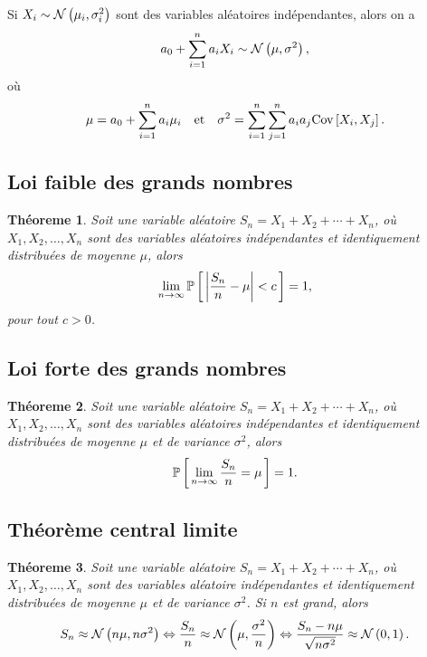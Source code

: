 \documentclass[11pt]{article}
\renewcommand\P[1]{%
	\ensuremath{%
		\mathbb{P}\left[\,#1\,\right]%
	}%
}%
\newcommand\Norm[2]{%
	\ensuremath{%
		\mathcal{N}\left(#1,#2\right)%
	}%
}%
\newcommand\Cov[2]{%
	\ensuremath{%
		\mathrm{Cov}\left[#1,#2\right]%
	}%
}%
\newtheorem{theoreme}{Théoreme}[section]
\theoremstyle{remark}
\theoremstyle{definition}
\begin{document}
\begin{exemple}
	Si $X_i\sim\Norm{\mu_i}{\sigma_i^2}$ sont des variables aléatoires
	indépendantes, alors on a
	\begin{equation*}
		a_0+\sum_{i=1}^na_iX_i\sim\Norm{\mu}{\sigma^2},
	\end{equation*}
	où
	\begin{equation*}
		\mu=a_0+\sum_{i=1}^na_i\mu_i
		\quad\text{et}\quad
		\sigma^2=\sum_{i=1}^n\sum_{j=1}^na_ia_j\Cov{X_i}{X_j}.
	\end{equation*}
\end{exemple}

\subsection{Loi faible des grands nombres}
\begin{theoreme}
	Soit une variable aléatoire $S_n=X_1+X_2+\cdots+X_n$, où $X_1,X_2,\dots,
	X_n$ sont des variables aléatoires indépendantes et identiquement
	distribuées de moyenne $\mu$, alors
	\begin{equation*}
		\lim_{n\rightarrow\infty}\P{\left\rvert
			\frac{S_n}{n}-\mu
		\right\rvert<c}=1,
	\end{equation*}
	pour tout $c>0$.
\end{theoreme}

\subsection{Loi forte des grands nombres}
\begin{theoreme}
	Soit une variable aléatoire $S_n=X_1+X_2+\cdots+X_n$, où $X_1,X_2,\dots,
	X_n$ sont des variables aléatoires indépendantes et identiquement
	distribuées de moyenne $\mu$ et de variance $\sigma^2$, alors
	\begin{equation*}
		\P{\lim_{n\rightarrow\infty}\frac{S_n}{n}=\mu}=1.
	\end{equation*}
\end{theoreme}

\subsection{Théorème central limite}
\begin{theoreme}
	Soit une variable aléatoire $S_n=X_1+X_2+\cdots+X_n$, où $X_1,X_2,\dots,
	X_n$ sont des variables aléatoire indépendantes et identiquement
	distribuées de moyenne $\mu$ et de variance $\sigma^2$. Si $n$ est
	\textit{grand}, alors
	\begin{equation*}
		S_n\approx\Norm{n\mu}{n\sigma^2}
		\Leftrightarrow
		\frac{S_n}{n}\approx\Norm{\mu}{\frac{\sigma^2}{n}}
		\Leftrightarrow
		\frac{S_n-n\mu}{\sqrt{n\sigma^2}}\approx\Norm{0}{1}.
	\end{equation*}
\end{theoreme}
\end{document}
